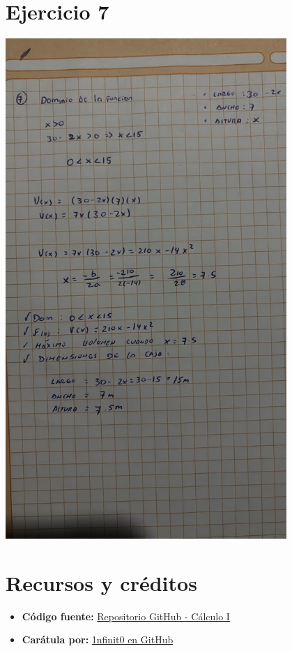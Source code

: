 \documentclass[12pt]{article}
\begin{document}
\newpage
\section*{Ejercicio 7}
\begin{center}
  \includegraphics[width=0.8\textwidth]{./assets/ejercicio7.jpg}
\end{center}

\newpage
\section*{Recursos y créditos}

\begin{itemize}
    \item \textbf{Código fuente:} \href{https://github.com/MateoTVara/C08-CalculoI}{Repositorio GitHub - Cálculo I}
    \item \textbf{Carátula por:} \href{https://github.com/1nfinit0}{1nfinit0 en GitHub}
\end{itemize}
\end{document}
